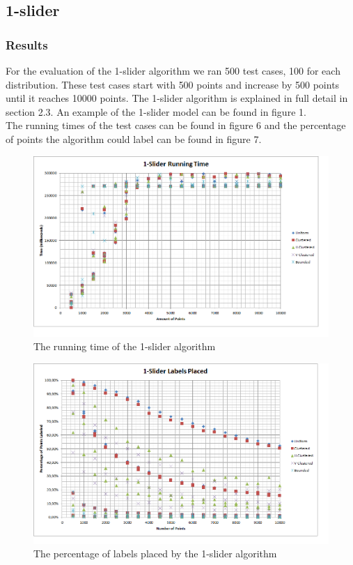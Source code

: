 \documentclass[crop=false,a4paper,oneside,11pt]{standalone}
\begin{document}
\subsection{1-slider}
\subsubsection{Results}
For the evaluation of the 1-slider algorithm we ran 500 test cases, 100 for each distribution. These test cases start with 500 points and increase by 500 points until it reaches 10000 points. The 1-slider algorithm is explained in full detail in section 2.3. An example of the 1-slider model can be found in figure 1.\\
 The running times of the test cases can be found in figure 6 and the percentage of points the algorithm could label can be found in figure 7.

 \begin{figure}[H]
 \centering
 \centerline{\includegraphics[scale = 0.65]{1slider.png}}
 \caption{The running time of the 1-slider algorithm}
 \end{figure}

 \begin{figure}[H]
 \centering
  \centerline{\includegraphics[scale = 0.65]{1sliderplaced.png}}
  \caption{The percentage of labels placed by the 1-slider algorithm}
 \end{figure}
\end{document}
